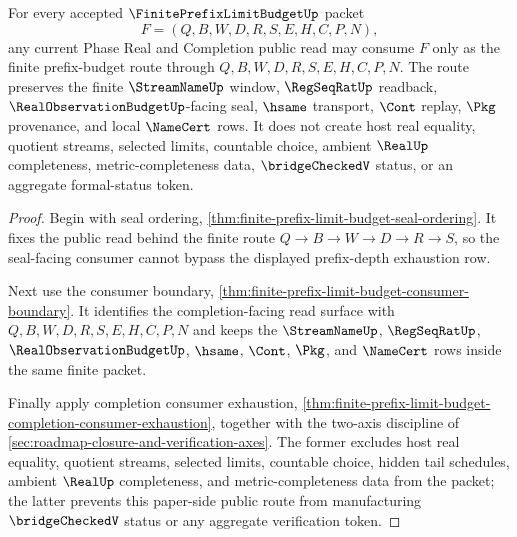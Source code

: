 \begin{theorem}
\label{thm:finite-prefix-limit-budget-public-axis-scope}
For every accepted $\FinitePrefixLimitBudgetUp$ packet
$$
F=(Q,B,W,D,R,S,E,H,C,P,N),
$$
any current Phase Real and Completion public read may consume $F$ only as the finite prefix-budget route through $Q,B,W,D,R,S,E,H,C,P,N$. The route preserves the finite $\StreamNameUp$ window, $\RegSeqRatUp$ readback, $\RealObservationBudgetUp$-facing seal, $\hsame$ transport, $\Cont$ replay, $\Pkg$ provenance, and local $\NameCert$ rows. It does not create host real equality, quotient streams, selected limits, countable choice, ambient $\RealUp$ completeness, metric-completeness data, $\bridgeCheckedV$ status, or an aggregate formal-status token.
\end{theorem}
\begin{proof}
Begin with seal ordering, \autoref{thm:finite-prefix-limit-budget-seal-ordering}. It fixes the public read behind the finite route $Q \to B \to W \to D \to R \to S$, so the seal-facing consumer cannot bypass the displayed prefix-depth exhaustion row.

Next use the consumer boundary, \autoref{thm:finite-prefix-limit-budget-consumer-boundary}. It identifies the completion-facing read surface with $Q,B,W,D,R,S,E,H,C,P,N$ and keeps the $\StreamNameUp$, $\RegSeqRatUp$, $\RealObservationBudgetUp$, $\hsame$, $\Cont$, $\Pkg$, and $\NameCert$ rows inside the same finite packet.

Finally apply completion consumer exhaustion, \autoref{thm:finite-prefix-limit-budget-completion-consumer-exhaustion}, together with the two-axis discipline of \autoref{sec:roadmap-closure-and-verification-axes}. The former excludes host real equality, quotient streams, selected limits, countable choice, hidden tail schedules, ambient $\RealUp$ completeness, and metric-completeness data from the packet; the latter prevents this paper-side public route from manufacturing $\bridgeCheckedV$ status or any aggregate verification token.
\end{proof}

